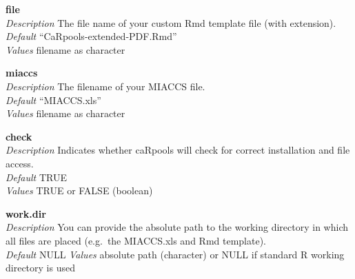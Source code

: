 \documentclass[]{article}
\begin{document}
\textbf{file}\\
\emph{Description} The file name of your custom Rmd template file (with
extension).\\
\emph{Default} ``CaRpools-extended-PDF.Rmd''\\
\emph{Values} filename as character

\textbf{miaccs}\\
\emph{Description} The filename of your MIACCS file.\\
\emph{Default} ``MIACCS.xls''\\
\emph{Values} filename as character

\textbf{check}\\
\emph{Description} Indicates whether caRpools will check for correct
installation and file access.\\
\emph{Default} TRUE\\
\emph{Values} TRUE or FALSE (boolean)

\textbf{work.dir}\\
\emph{Description} You can provide the absolute path to the working
directory in which all files are placed (e.g.~the MIACCS.xls and Rmd
template).\\
\emph{Default} NULL \emph{Values} absolute path (character) or NULL if
standard R working directory is used
\end{document}
